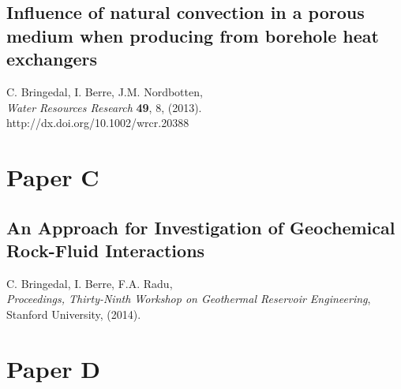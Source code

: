 \section*{Influence of natural convection in a porous medium when producing from borehole heat exchangers}

\noindent C. Bringedal, I. Berre, J.M. Nordbotten, \\

\noindent \textit{Water Resources Research} \textbf{49}, 8, (2013). \\ http://dx.doi.org/10.1002/wrcr.20388

\cleardoublepage





\chapter*{Paper C}
\section*{An Approach for Investigation of Geochemical Rock-Fluid Interactions}

\noindent C. Bringedal, I. Berre, F.A. Radu, \\

\noindent \textit{Proceedings, Thirty-Ninth Workshop on Geothermal Reservoir Engineering}, Stanford University, (2014).

\cleardoublepage





\chapter*{Paper D}
